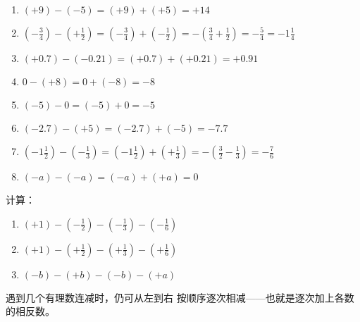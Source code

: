 \begin{solution}
	\begin{enumerate}
		\item $(+9)-(-5)=(+9)+(+5)=+14$
		\item $\left(-\frac{3}{4}\right)-\left(+\frac{1}{2}\right)=\left(-\frac{3}{4}\right)+\left(-\frac{1}{2}\right)=-\left(\frac{3}{4}+\frac{1}{2}\right)=-\frac{5}{4}=-1\frac{1}{4}$
		\item $(+0.7)-(-0.21)=(+0.7)+(+0.21)=+0.91$
		\item $0-(+8)=0+(-8)=-8$
		\item $(-5)-0=(-5)+0=-5$
		\item $(-2.7)-(+5)=(-2.7)+(-5)=-7.7$
		\item $\left(-1\frac{1}{2}\right)-\left(-\frac{1}{3}\right)=\left(-1\frac{1}{2}\right)+\left(+\frac{1}{3}\right)=-\left(\frac{3}{2}-\frac{1}{3}\right)=-\frac{7}{6}$
		\item $(-a)-(-a)=(-a)+(+a)=0$
	\end{enumerate}    
\end{solution}

\begin{example}
	计算：
	\begin{enumerate}
		\item $(+1)-\left(-\frac{1}{2}\right)-\left(-\frac{1}{3}\right)-\left(-\frac{1}{6}\right)$
		\item $(+1)-\left(+\frac{1}{2}\right)-\left(+\frac{1}{3}\right)-\left(+\frac{1}{6}\right)$
		\item $(-b)-(+b)-(-b)-(+a)$
	\end{enumerate}
\end{example}

\begin{analyze}
	遇到几个有理数连减时，仍可从左到右
	按顺序逐次相减——也就是逐次加上各数的相反数。
\end{analyze}

